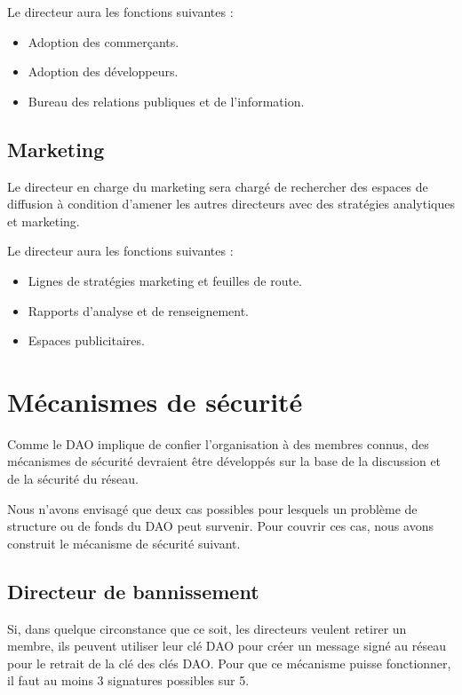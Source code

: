 \documentclass{article}
\begin{document}
Le directeur aura les fonctions suivantes :

\begin{itemize}
  \item Adoption des commerçants.
  \item Adoption des développeurs.
  \item Bureau des relations publiques et de l'information.
\end{itemize}

\subsection{Marketing}

Le directeur en charge du marketing sera chargé de rechercher des espaces de diffusion à condition d'amener les autres directeurs avec des stratégies analytiques et marketing.

Le directeur aura les fonctions suivantes :

\begin{itemize}
  \item Lignes de stratégies marketing et feuilles de route.
  \item Rapports d'analyse et de renseignement.
  \item Espaces publicitaires.
\end{itemize}

\section{Mécanismes de sécurité}

Comme le DAO implique de confier l'organisation à des membres connus, des mécanismes de sécurité devraient être développés sur la base de la discussion et de la sécurité du réseau.

Nous n'avons envisagé que deux cas possibles pour lesquels un problème de structure ou de fonds du DAO peut survenir. Pour couvrir ces cas, nous avons construit le mécanisme de sécurité suivant.

\subsection{Directeur de bannissement}

Si, dans quelque circonstance que ce soit, les directeurs veulent retirer un membre, ils peuvent utiliser leur clé DAO pour créer un message signé au réseau pour le retrait de la clé des clés DAO. Pour que ce mécanisme puisse fonctionner, il faut au moins 3 signatures possibles sur 5.
\end{document}
